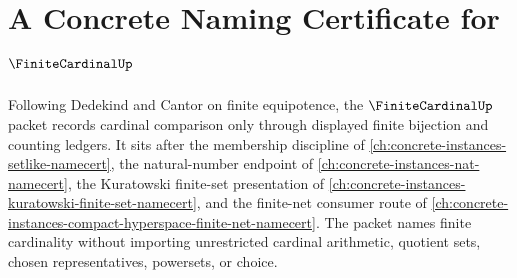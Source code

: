 \chapter{A Concrete Naming Certificate for $\FiniteCardinalUp$}
\label{ch:concrete-instances-finite-cardinal-namecert}

Following Dedekind and Cantor on finite equipotence, the $\FiniteCardinalUp$ packet records cardinal comparison only through displayed finite bijection and counting ledgers. It sits after the membership discipline of \autoref{ch:concrete-instances-setlike-namecert}, the natural-number endpoint of \autoref{ch:concrete-instances-nat-namecert}, the Kuratowski finite-set presentation of \autoref{ch:concrete-instances-kuratowski-finite-set-namecert}, and the finite-net consumer route of \autoref{ch:concrete-instances-compact-hyperspace-finite-net-namecert}. The packet names finite cardinality without importing unrestricted cardinal arithmetic, quotient sets, chosen representatives, powersets, or choice.

